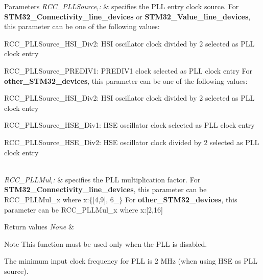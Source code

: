 \begin{DoxyParams}{Parameters}
{\em R\-C\-C\-\_\-\-P\-L\-L\-Source,\-:} & specifies the P\-L\-L entry clock source. For {\bfseries S\-T\-M32\-\_\-\-Connectivity\-\_\-line\-\_\-devices} or {\bfseries S\-T\-M32\-\_\-\-Value\-\_\-line\-\_\-devices}, this parameter can be one of the following values\-: \begin{DoxyItemize}
\item R\-C\-C\-\_\-\-P\-L\-L\-Source\-\_\-\-H\-S\-I\-\_\-\-Div2\-: H\-S\-I oscillator clock divided by 2 selected as P\-L\-L clock entry \item R\-C\-C\-\_\-\-P\-L\-L\-Source\-\_\-\-P\-R\-E\-D\-I\-V1\-: P\-R\-E\-D\-I\-V1 clock selected as P\-L\-L clock entry For {\bfseries other\-\_\-\-S\-T\-M32\-\_\-devices}, this parameter can be one of the following values\-: \item R\-C\-C\-\_\-\-P\-L\-L\-Source\-\_\-\-H\-S\-I\-\_\-\-Div2\-: H\-S\-I oscillator clock divided by 2 selected as P\-L\-L clock entry \item R\-C\-C\-\_\-\-P\-L\-L\-Source\-\_\-\-H\-S\-E\-\_\-\-Div1\-: H\-S\-E oscillator clock selected as P\-L\-L clock entry \item R\-C\-C\-\_\-\-P\-L\-L\-Source\-\_\-\-H\-S\-E\-\_\-\-Div2\-: H\-S\-E oscillator clock divided by 2 selected as P\-L\-L clock entry \end{DoxyItemize}
\\
\hline
{\em R\-C\-C\-\_\-\-P\-L\-L\-Mul,\-:} & specifies the P\-L\-L multiplication factor. For {\bfseries S\-T\-M32\-\_\-\-Connectivity\-\_\-line\-\_\-devices}, this parameter can be R\-C\-C\-\_\-\-P\-L\-L\-Mul\-\_\-x where x\-:\{\mbox{[}4,9\mbox{]}, 6\-\_\} For {\bfseries other\-\_\-\-S\-T\-M32\-\_\-devices}, this parameter can be R\-C\-C\-\_\-\-P\-L\-L\-Mul\-\_\-x where x\-:\mbox{[}2,16\mbox{]} \\
\hline
\end{DoxyParams}

\begin{DoxyRetVals}{Return values}
{\em None} & \\
\hline
\end{DoxyRetVals}
\begin{DoxyNote}{Note}
This function must be used only when the P\-L\-L is disabled. 

The minimum input clock frequency for P\-L\-L is 2 M\-Hz (when using H\-S\-E as P\-L\-L source). 
\end{DoxyNote}

